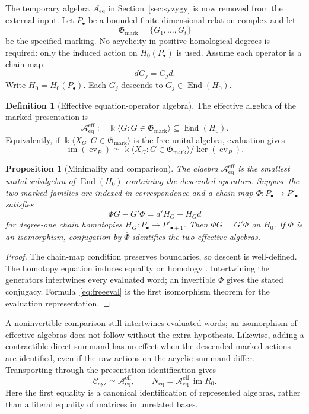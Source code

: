 \documentclass[11pt]{amsart}
\newtheorem{proposition}[theorem]{Proposition}
\theoremstyle{definition}
\newtheorem{definition}[theorem]{Definition}
\newcommand{\kk}{\Bbbk}
\newcommand{\im}{\operatorname{im}}
\newcommand{\End}{\operatorname{End}}
\newcommand{\Aeff}{\mathscr A_{\mathrm{eq}}^{\mathrm{eff}}}
\newcommand{\Aeq}{\mathscr A_{\mathrm{eq}}}
\newcommand{\Neq}{N_{\mathrm{eq}}}
\newcommand{\Gmark}{\mathfrak G_{\mathrm{mark}}}
\newcommand{\Csyz}{\mathscr C_{\mathrm{syz}}}
\begin{document}
The temporary algebra $\Aeq$ in Section~\ref{sec:syzygy} is now removed
from the external input. Let $P_\bullet$ be a bounded finite-dimensional
relation complex and let
\[
\Gmark=\{G_1,\ldots,G_t\}
\]
be the specified marking. No acyclicity in positive homological degrees
is required: only the induced action on $H_0(P_\bullet)$ is used.
Assume each operator is a chain map:
\[
dG_j=G_jd.
\]
Write \(H_0=H_0(P_\bullet)\). Each \(G_j\) descends to \(\bar G_j\in\End(H_0)\).

\begin{definition}[Effective equation-operator algebra]
The effective algebra of the marked presentation is
\begin{equation}
\Aeff:=\kk\langle\bar G:G\in\Gmark\rangle
\subseteq\End(H_0).
\label{eq:Aeff}
\end{equation}
Equivalently, if \(\kk\langle X_G:G\in\Gmark\rangle\) is the free unital algebra, evaluation gives
\begin{equation}
\im(\operatorname{ev}_P)
\simeq
\kk\langle X_G:G\in\Gmark\rangle/\ker(\operatorname{ev}_P).
\label{eq:freeeval}
\end{equation}
\end{definition}

\begin{proposition}[Minimality and comparison]\label{prop:algebra-comparison}
The algebra \(\Aeff\) is the smallest unital subalgebra of \(\End(H_0)\) containing
the descended operators. Suppose the two marked families are indexed in correspondence
and a chain map \(\Phi:P_\bullet\to P'_\bullet\) satisfies
\[
\Phi G-G'\Phi=d'H_G+H_Gd
\]
for degree-one chain homotopies \(H_G:P_\bullet\to P'_{\bullet+1}\).
Then \(\bar\Phi\bar G=\bar G'\bar\Phi\) on \(H_0\). If \(\bar\Phi\) is an
isomorphism, conjugation by \(\bar\Phi\) identifies the two effective algebras.
\end{proposition}
\begin{proof}
The chain-map condition preserves boundaries, so descent is well-defined.
The homotopy equation induces equality on homology \cite{StacksHomotopy}.
Intertwining the generators intertwines every evaluated word; an invertible
\(\bar\Phi\) gives the stated conjugacy. Formula~\eqref{eq:freeeval} is the
first isomorphism theorem for the evaluation representation.
\end{proof}

A noninvertible comparison still intertwines evaluated words; an isomorphism
of effective algebras does not follow without the extra hypothesis.
Likewise, adding a contractible direct summand has no effect when the descended
marked actions are identified, even if the raw actions on the acyclic summand differ.
Transporting through the presentation identification gives
\[
\Csyz\simeq\Aeff,\qquad \Neq=\Aeff\,\im R_0.
\]
Here the first equality is a canonical identification of represented algebras,
rather than a literal equality of matrices in unrelated bases.
\end{document}

